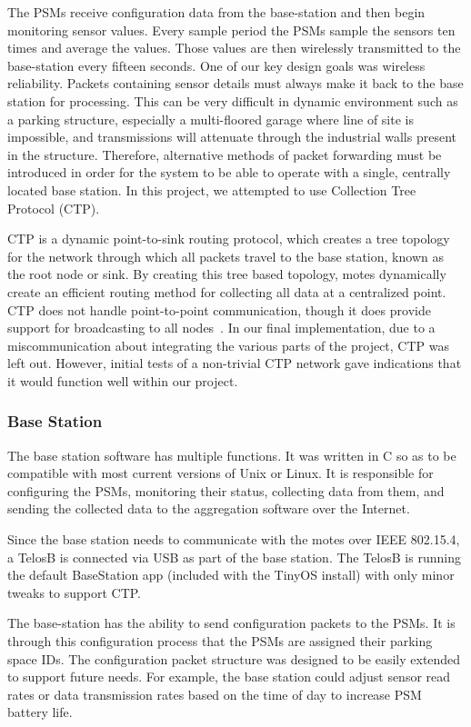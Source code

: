 \documentclass{acm_proc}
\begin{document}
The PSMs receive configuration data from the base-station and then begin
monitoring sensor values.
Every sample period the PSMs sample the sensors ten times and average the
values.
Those values are then wirelessly transmitted to the base-station every
fifteen seconds.
One of our key design goals was wireless reliability.
Packets containing sensor details must always make it back to the base station for processing.
This can be very difficult in dynamic environment such as a parking
structure, especially a multi-floored garage where line of site is
impossible, and transmissions will attenuate through the industrial walls present in the structure.
Therefore, alternative methods of packet forwarding must be introduced in
order for the system to be able to operate with a single, centrally located
base station.
In this project, we attempted to use Collection Tree Protocol (CTP).

CTP is a dynamic point-to-sink routing protocol, which creates a tree
topology for the network through which all packets travel to the base
station, known as the root node or sink.  By creating this tree based
topology, motes dynamically create an efficient routing method for
collecting all data at a centralized point.  CTP does not handle
point-to-point communication, though it does provide support for
broadcasting to all nodes~\cite{tep123:collection-tree-protocol}.
In our final implementation, due to a miscommunication about integrating
the various parts of the project, CTP was left out.
However, initial tests of a non-trivial CTP network gave indications that
it would function well within our project.

\subsubsection{Base Station}

The base station software has multiple functions.  It was written in C so
as to be compatible with most current versions of Unix or Linux.
It is responsible for configuring the PSMs, monitoring their status, collecting data from them, and sending the collected data to the aggregation software over the Internet.

Since the base station needs to communicate with the motes over IEEE
802.15.4, a TelosB is connected via USB as part of the base station.
The TelosB is running the default BaseStation app (included with the TinyOS
install) with only minor tweaks to support CTP.

The base-station has the ability to send configuration packets to the PSMs.
It is through this configuration process that the PSMs are assigned their
parking space IDs.
The configuration packet structure was designed to be easily extended to
support future needs.
For example, the base station could adjust sensor read rates or data
transmission rates based on the time of day to increase PSM battery life.
\end{document}
